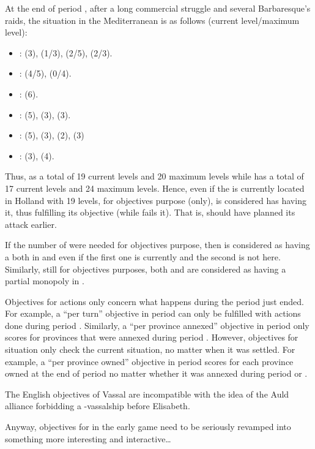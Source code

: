 \begin{exemple}
  At the end of period , after a long commercial struggle
  and several Barbaresque's raids, the situation in the Mediterranean is
  as follows (current level/maximum level):
  \begin{itemize}
  \item {}: \HOL (3), \HIS (1/3), \VEN (2/5), \FRA (2/3).
  \item {}: \HOL(4/5), \VEN (0/4).
  \item {}: \VEN (6).
  \item {}: \TUR (5), \VEN (3), \HOL (3).
  \item {}: \HOL (5), \VEN (3), \TUR (2), \FRA (3)
  \item {}: \VEN (3), \HOL (4).
  \end{itemize}
  Thus, \HOL as a total of 19 current levels and 20 maximum levels while
  \VEN has a total of 17 current levels and 24 maximum levels. Hence,
  even if the  is currently located in Holland with 19
  levels, for objectives purpose (only), \VEN is considered has having
  it, thus fulfilling its objective (while \HOL fails it). That is, \HOL
  should have planned its attack earlier.

  If the number of \TradeFLEET were needed for objectives purpose, then
  \VEN is considered as having a \TradeFLEET\faceplus both in 
  and  even if the first one is currently \Facemoins and
  the second is not here. Similarly, still for objectives purposes, both
  \HOL and \VEN are considered as having a partial monopoly in
  .
\end{exemple}

\aparag[Duration.] Objectives for actions only concern what happens
during the period just ended.
\bparag For example, a ``per turn'' objective in period  can
only be fulfilled with actions done during period
.
\bparag Similarly, a ``per province annexed'' objective in period
 only scores \VPs for provinces that were annexed during
period .
\bparag However, objectives for situation only check the current
situation, no matter when it was settled.
\bparag For example, a ``per province owned'' objective in period
 scores for each province owned at the end of period
 no matter whether it was annexed during period  or
.

\begin{todo}
  The English objectives of \paysEcosse Vassal are incompatible with the
  idea of the Auld alliance forbidding a \ANG-\paysEcosse vassalship
  before Elisabeth.

  Anyway, objectives for \ANG in the early game need to be seriously
  revamped into something more interesting and interactive\ldots
\end{todo}

